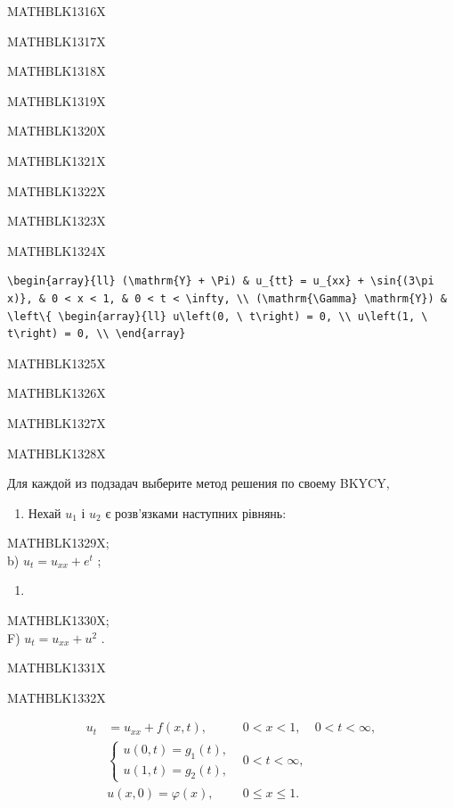 \documentclass[
  ukrainian,
]{article}
\providecommand{\tightlist}{%
  \setlength{\itemsep}{0pt}\setlength{\parskip}{0pt}}
\begin{document}
MATHBLK1316X

MATHBLK1317X

MATHBLK1318X

MATHBLK1319X

MATHBLK1320X

MATHBLK1321X

MATHBLK1322X

MATHBLK1323X

MATHBLK1324X

\begin{verbatim}
\begin{array}{ll} (\mathrm{Y} + \Pi) & u_{tt} = u_{xx} + \sin{(3\pi x)}, & 0 < x < 1, & 0 < t < \infty, \\ (\mathrm{\Gamma} \mathrm{Y}) & \left\{ \begin{array}{ll} u\left(0, \ t\right) = 0, \\ u\left(1, \ t\right) = 0, \\ \end{array}
\end{verbatim}

MATHBLK1325X

MATHBLK1326X

MATHBLK1327X

MATHBLK1328X

Для каждой из подзадач выберите метод решения по своему BKYCY,

\begin{enumerate}
\def\labelenumi{\arabic{enumi}.}
\setcounter{enumi}{2}
\tightlist
\item
  Нехай \(u_1\) і \(u_2\) є розв'язками наступних рівнянь:
\end{enumerate}

MATHBLK1329X;\\
b) \(u_t = u_{xx} + e^t\) ;

\begin{enumerate}
\def\labelenumi{\Alph{enumi})}
\setcounter{enumi}{1}
\tightlist
\item
\end{enumerate}

MATHBLK1330X;\\
F) \(u_t = u_{xx} + u^2\) .

MATHBLK1331X

MATHBLK1332X

\[
\begin{aligned} u_t &= u_{xx} + f(x, t), & 0 < x < 1, & 0 < t < \infty, \\ & \begin{cases} u(0, t) = g_1(t), \\ u(1, t) = g_2(t), \end{cases} & 0 < t < \infty, \\ & u(x, 0) = \varphi(x), & 0 \le x \le 1. \end{aligned}
\]
\end{document}

